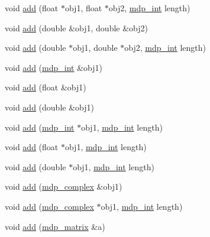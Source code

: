 \begin{DoxyCompactItemize}
\item 
void \hyperlink{classmdp__communicator_aba7a8da3cb9ef8f8fe782864fdfb4e48}{add} (float $\ast$obj1, float $\ast$obj2, \hyperlink{mdp__global__vars_8h_aaa1ad9d0dcd2124aa5af0120d9954174}{mdp\_\-int} length)
\item 
void \hyperlink{classmdp__communicator_a6386050a1fa9b536ab8eae4bc922fbad}{add} (double \&obj1, double \&obj2)
\item 
void \hyperlink{classmdp__communicator_a03f093e5354811e65cd862b6400b51de}{add} (double $\ast$obj1, double $\ast$obj2, \hyperlink{mdp__global__vars_8h_aaa1ad9d0dcd2124aa5af0120d9954174}{mdp\_\-int} length)
\item 
void \hyperlink{classmdp__communicator_a3d61eabaa51bd8492555478025fda1c6}{add} (\hyperlink{mdp__global__vars_8h_aaa1ad9d0dcd2124aa5af0120d9954174}{mdp\_\-int} \&obj1)
\item 
void \hyperlink{classmdp__communicator_a0cc36aa2f7f3cdcdfbf179af0a8e355d}{add} (float \&obj1)
\item 
void \hyperlink{classmdp__communicator_a9eb1537c0b4252cd9e553bd888630faf}{add} (double \&obj1)
\item 
void \hyperlink{classmdp__communicator_aedb0bdc142ac49ff99bfa185d8f8da09}{add} (\hyperlink{mdp__global__vars_8h_aaa1ad9d0dcd2124aa5af0120d9954174}{mdp\_\-int} $\ast$obj1, \hyperlink{mdp__global__vars_8h_aaa1ad9d0dcd2124aa5af0120d9954174}{mdp\_\-int} length)
\item 
void \hyperlink{classmdp__communicator_a931be4e0b188065e33a16877a63bfe01}{add} (float $\ast$obj1, \hyperlink{mdp__global__vars_8h_aaa1ad9d0dcd2124aa5af0120d9954174}{mdp\_\-int} length)
\item 
void \hyperlink{classmdp__communicator_ac78cceeab56a8e83a1921e1e930ce7d1}{add} (double $\ast$obj1, \hyperlink{mdp__global__vars_8h_aaa1ad9d0dcd2124aa5af0120d9954174}{mdp\_\-int} length)
\item 
void \hyperlink{classmdp__communicator_a94f4656c5dd9befe04abe0cf5bf83de0}{add} (\hyperlink{classmdp__complex}{mdp\_\-complex} \&obj1)
\item 
void \hyperlink{classmdp__communicator_aa5349744a5384adbbdd3cf7dc2a5b95a}{add} (\hyperlink{classmdp__complex}{mdp\_\-complex} $\ast$obj1, \hyperlink{mdp__global__vars_8h_aaa1ad9d0dcd2124aa5af0120d9954174}{mdp\_\-int} length)
\item 
void \hyperlink{classmdp__communicator_a5e533ae9ef363e9e39dfc9f788aeab19}{add} (\hyperlink{classmdp__matrix}{mdp\_\-matrix} \&a)
\item 

\end{DoxyCompactItemize}
